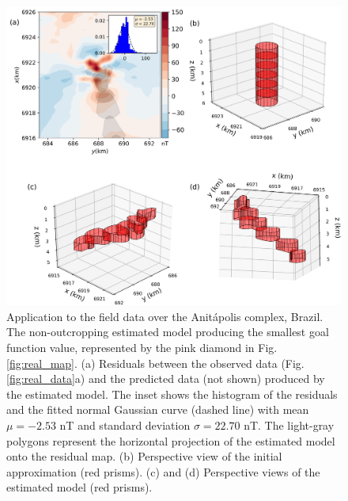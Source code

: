 \begin{figure}
	\centering
	\includegraphics[width=\linewidth]{figures/real_results_magenta_diamond.png}
	\caption{Application to the field data over the Anit{\'a}polis complex, Brazil.
	The non-outcropping estimated model producing the smallest goal function value, 
	represented by the pink diamond in Fig. \ref{fig:real_map}.
	(a) Residuals between the observed data (Fig. \ref{fig:real_data}a) and the 
	predicted data (not shown) produced by the estimated model. 
	The inset shows the histogram of the residuals and the fitted normal 
	Gaussian curve (dashed line) with mean $\mu = -2.53$ nT and standard deviation $\sigma = 22.70$ nT.
	The light-gray polygons represent the horizontal projection of the estimated 
	model onto the residual map. 
	(b) Perspective view of the initial approximation (red prisms). 
	(c) and (d) Perspective views of the estimated model (red prisms).}
	\label{fig:real_result2}
\end{figure}

